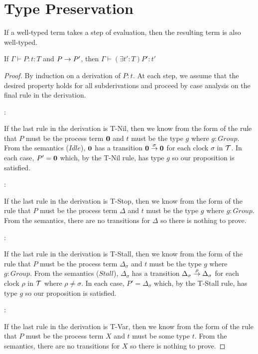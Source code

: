 \chapter{Type Preservation}

If a well-typed term takes a step of evaluation, then the resulting
term is also well-typed.

\begin{theorem}
If $\Gamma \vdash P : t : T$ and $P \stackrel{}{\rightarrow} P'$, then $\Gamma \vdash (\exists t' : T) P' : t'$
\end{theorem}

\begin{proof}
By induction on a derivation of $P:t$.  At each step, we assume that
the desired property holds for all subderivations and proceed by case
analysis on the final rule in the derivation.

:

\noindent If the last rule in the derivation is T-Nil, then we know
from the form of the rule that $P$ must be the process term $\textbf{0}$ and
$t$ must be the type $g$ where $g : Group$.  From the semantics
($Idle$), $\textbf{0}$ has a transition $\textbf{0} \stackrel{\sigma}{\rightarrow} \textbf{0}$ for
each clock $\sigma$ in $\text{$\mathcal{T}$}$.  In each case, $P' = \textbf{0}$ which, by
the T-Nil rule, has type $g$ so our proposition is satisfied.

:

\noindent If the last rule in the derivation is T-Stop, then we know
from the form of the rule that $P$ must be the process term $\Delta$
and $t$ must be the type $g$ where $g : Group$.  From the semantics,
there are no transitions for $\Delta$ so there is nothing to prove.

:

\noindent If the last rule in the derivation is T-Stall, then we know
from the form of the rule that $P$ must be the process term
$\Delta_\sigma$ and $t$ must be the type $g$ where $g : Group$.  From
the semantics ($Stall$), $\Delta_\sigma$ has a transition
$\Delta_\sigma \stackrel{\rho}{\rightarrow} \Delta_\sigma$ for each clock $\rho$ in
$\text{$\mathcal{T}$}$ where $\rho \ne \sigma$.  In each case, $P' = \Delta_\sigma$
which, by the T-Stall rule, has type $g$ so our proposition is
satisfied.

:

\noindent If the last rule in the derivation is T-Var, then we know
from the form of the rule that $P$ must be the process term $X$ and
$t$ must be some type $t$.  From the semantics, there are no
transitions for $X$ so there is nothing to prove.


\end{proof}
